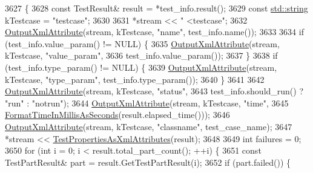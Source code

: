 \begin{DoxyCode}
3627                                                                             \{
3628   \textcolor{keyword}{const} TestResult& result = *test\_info.result();
3629   \textcolor{keyword}{const} \hyperlink{namespacetesting_1_1internal_a8e8ff5b11e64078831112677156cb111}{std::string} kTestcase = \textcolor{stringliteral}{"testcase"};
3630 
3631   *stream << \textcolor{stringliteral}{"    <testcase"};
3632   \hyperlink{classtesting_1_1internal_1_1XmlUnitTestResultPrinter_aa8ca7066de948d26d171597430c75839}{OutputXmlAttribute}(stream, kTestcase, \textcolor{stringliteral}{"name"}, test\_info.name());
3633 
3634   \textcolor{keywordflow}{if} (test\_info.value\_param() != NULL) \{
3635     \hyperlink{classtesting_1_1internal_1_1XmlUnitTestResultPrinter_aa8ca7066de948d26d171597430c75839}{OutputXmlAttribute}(stream, kTestcase, \textcolor{stringliteral}{"value\_param"},
3636                        test\_info.value\_param());
3637   \}
3638   \textcolor{keywordflow}{if} (test\_info.type\_param() != NULL) \{
3639     \hyperlink{classtesting_1_1internal_1_1XmlUnitTestResultPrinter_aa8ca7066de948d26d171597430c75839}{OutputXmlAttribute}(stream, kTestcase, \textcolor{stringliteral}{"type\_param"}, test\_info.type\_param());
3640   \}
3641 
3642   \hyperlink{classtesting_1_1internal_1_1XmlUnitTestResultPrinter_aa8ca7066de948d26d171597430c75839}{OutputXmlAttribute}(stream, kTestcase, \textcolor{stringliteral}{"status"},
3643                      test\_info.should\_run() ? \textcolor{stringliteral}{"run"} : \textcolor{stringliteral}{"notrun"});
3644   \hyperlink{classtesting_1_1internal_1_1XmlUnitTestResultPrinter_aa8ca7066de948d26d171597430c75839}{OutputXmlAttribute}(stream, kTestcase, \textcolor{stringliteral}{"time"},
3645                      \hyperlink{namespacetesting_1_1internal_a904485f27a54be8a5a92856e2d838797}{FormatTimeInMillisAsSeconds}(result.elapsed\_time()));
3646   \hyperlink{classtesting_1_1internal_1_1XmlUnitTestResultPrinter_aa8ca7066de948d26d171597430c75839}{OutputXmlAttribute}(stream, kTestcase, \textcolor{stringliteral}{"classname"}, test\_case\_name);
3647   *stream << \hyperlink{classtesting_1_1internal_1_1XmlUnitTestResultPrinter_aaac4f1352a2cc46f6a69994d45999f0b}{TestPropertiesAsXmlAttributes}(result);
3648 
3649   \textcolor{keywordtype}{int} failures = 0;
3650   \textcolor{keywordflow}{for} (\textcolor{keywordtype}{int} i = 0; i < result.total\_part\_count(); ++i) \{
3651     \textcolor{keyword}{const} TestPartResult& part = result.GetTestPartResult(i);
3652     \textcolor{keywordflow}{if} (part.failed()) \{

\end{DoxyCode}
